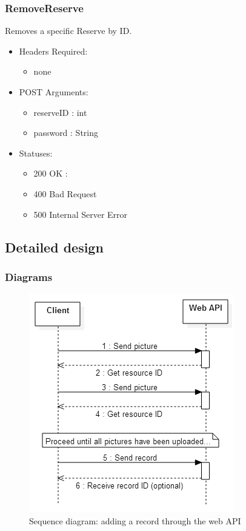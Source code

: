     \subsubsection{RemoveReserve}
        Removes a specific Reserve by ID.
        \begin{itemize}
            \item Headers Required:
            \begin{itemize}
                \item none
            \end{itemize}
            \item POST Arguments:
            \begin{itemize}
                \item reserveID : int
                \item password : String
            \end{itemize}
            \item Statuses: 
            \begin{itemize}
                \item 200 OK : 
                \item 400 Bad Request
                \item 500 Internal Server Error
            \end{itemize}
        \end{itemize}


\subsection{Detailed design}
    \subsubsection{Diagrams}
        \begin{figure}
            \centering
            \includegraphics[scale=0.75]{server/working/SequenceDiagram-AddRecord.png}
            \caption{Sequence diagram: adding a record through the web API}
            \label{fig:addRecordSequenceDiagram}
        \end{figure}

